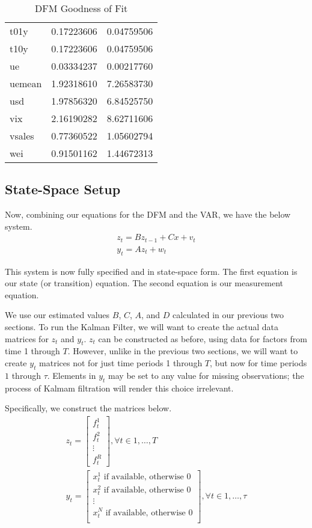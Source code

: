 \documentclass[11pt, letterpaper]{article}\usepackage[]{graphicx}\usepackage[]{color}
\begin{document}
\begin{table}[H]
\begin{tabular}{lrr}
  t01y & 0.17223606 & 0.04759506 \\ 
  t10y & 0.17223606 & 0.04759506 \\ 
  ue & 0.03334237 & 0.00217760 \\ 
  uemean & 1.92318610 & 7.26583730 \\ 
  usd & 1.97856320 & 6.84525750 \\ 
  vix & 2.16190282 & 8.62711606 \\ 
  vsales & 0.77360522 & 1.05602794 \\ 
  wei & 0.91501162 & 1.44672313 \\ 
   \hline
\end{tabular}
\endgroup
\caption{DFM Goodness of Fit} 
\end{table}






\subsection{State-Space Setup}
Now, combining our equations for the DFM and the VAR, we have the below system.
\begin{align*}
z_t = B z_{t-1} + Cx + v_t\\
y_t = A z_t + w_t
\end{align*}

This system is now fully specified and in state-space form. The first equation is our state (or transition) equation. The second equation is our measurement equation. 

We use our estimated values $B$, $C$, $A$, and $D$ calculated in our previous two sections. To run the Kalman Filter, we will want to create the actual data matrices for $z_t$ and $y_t$. $z_t$ can be constructed as before, using data for factors from time 1 through $T$. However, unlike in the previous two sections, we will want to create $y_t$ matrices not for just time periods 1 through $T$, but now for time periods $1$ through $\tau$. Elements in $y_t$ may be set to any value for missing observations; the process of Kalmam filtration will render this choice irrelevant.

Specifically, we construct the matrices below.
\begin{align*}
z_t
=
\begin{bmatrix}
	f^1_{t}\\
	f^2_{t}\\
	\vdots \\
	f^R_{t}
\end{bmatrix}, \forall t \in 1, \dots, T\\
y_t
=
\begin{bmatrix}
	\text{$x^1_{t}$ if available, otherwise 0}\\
	\text{$x^2_{t}$ if available, otherwise 0}\\
	\vdots \\
	\text{$x^N_{t}$ if available, otherwise 0}\\
\end{bmatrix}, \forall t \in 1, \dots, \tau
\end{align*}
\end{document}
